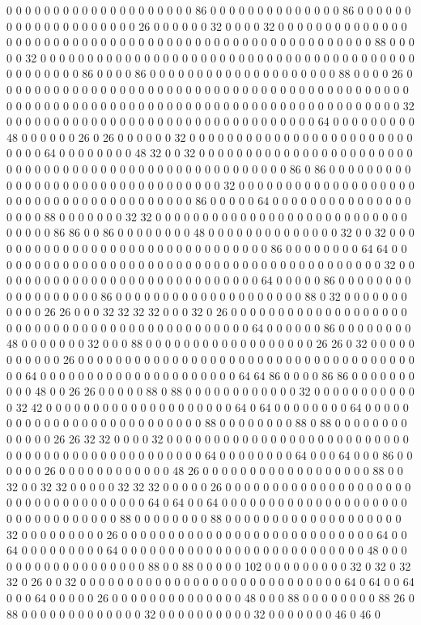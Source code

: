 0 0 0 0 0 0 0 0 0 0 0 0 0 0 0 0 0 0 0 0 86 0 0 0 0 0 0 0 0 0 0 0 0 0 0 86 0 0 0 0 0 0 0 0 0 0 0 0 0 0 0 0 0 0 0 0 26 0 0 0 0 0 0 32 0 0 0 0 32 0 0 0 0 0 0 0 0 0 0 0 0 0 0 0 0 0 0 0 0 0 0 0 0 0 0 0 0 0 0 0 0 0 0 0 0 0 0 0 0 0 0 0 0 0 0 0 0 0 0 0 0 0 88 0 0 0 0 0 32 0 0 0 0 0 0 0 0 0 0 0 0 0 0 0 0 0 0 0 0 0 0 0 0 0 0 0 0 0 0 0 0 0 0 0 0 0 0 0 0 0 0 0 0 0 0 0 0 86 0 0 0 0 86 0 0 0 0 0 0 0 0 0 0 0 0 0 0 0 0 0 0 0 0 88 0 0 0 0 26 0 0 0 0 0 0 0 0 0 0 0 0 0 0 0 0 0 0 0 0 0 0 0 0 0 0 0 0 0 0 0 0 0 0 0 0 0 0 0 0 0 0 0 0 0 0 0 0 0 0 0 0 0 0 0 0 0 0 0 0 0 0 0 0 0 0 0 0 0 0 0 0 0 0 0 0 0 0 0 0 0 0 0 0 0 0 32 0 0 0 0 0 0 0 0 0 0 0 0 0 0 0 0 0 0 0 0 0 0 0 0 0 0 0 0 0 0 0 0 0 64 0 0 0 0 0 0 0 0 0 48 0 0 0 0 0 0 26 0 26 0 0 0 0 0 0 32 0 0 0 0 0 0 0 0 0 0 0 0 0 0 0 0 0 0 0 0 0 0 0 0 0 0 0 0 64 0 0 0 0 0 0 0 0 48 32 0 0 32 0 0 0 0 0 0 0 0 0 0 0 0 0 0 0 0 0 0 0 0 0 0 0 0 0 0 0 0 0 0 0 0 0 0 0 0 0 0 0 0 0 0 0 0 0 0 0 0 0 0 0 0 0 86 0 86 0 0 0 0 0 0 0 0 0 0 0 0 0 0 0 0 0 0 0 0 0 0 0 0 0 0 0 0 0 0 0 0 32 0 0 0 0 0 0 0 0 0 0 0 0 0 0 0 0 0 0 0 0 0 0 0 0 0 0 0 0 0 0 0 0 0 0 0 0 0 0 0 86 0 0 0 0 0 64 0 0 0 0 0 0 0 0 0 0 0 0 0 0 0 0 0 0 0 88 0 0 0 0 0 0 0 32 32 0 0 0 0 0 0 0 0 0 0 0 0 0 0 0 0 0 0 0 0 0 0 0 0 0 0 0 0 0 0 0 0 86 86 0 0 86 0 0 0 0 0 0 0 0 48 0 0 0 0 0 0 0 0 0 0 0 0 0 0 32 0 0 32 0 0 0 0 0 0 0 0 0 0 0 0 0 0 0 0 0 0 0 0 0 0 0 0 0 0 0 0 0 0 0 86 0 0 0 0 0 0 0 0 64 64 0 0 0 0 0 0 0 0 0 0 0 0 0 0 0 0 0 0 0 0 0 0 0 0 0 0 0 0 0 0 0 0 0 0 0 0 0 0 0 0 0 0 32 0 0 0 0 0 0 0 0 0 0 0 0 0 0 0 0 0 0 0 0 0 0 0 0 0 0 0 0 0 64 0 0 0 0 0 86 0 0 0 0 0 0 0 0 0 0 0 0 0 0 0 0 0 0 86 0 0 0 0 0 0 0 0 0 0 0 0 0 0 0 0 0 0 0 0 88 0 32 0 0 0 0 0 0 0 0 0 0 0 26 26 0 0 0 32 32 32 32 0 0 0 32 0 26 0 0 0 0 0 0 0 0 0 0 0 0 0 0 0 0 0 0 0 0 0 0 0 0 0 0 0 0 0 0 0 0 0 0 0 0 0 0 0 0 0 0 0 0 0 64 0 0 0 0 0 0 86 0 0 0 0 0 0 0 0 48 0 0 0 0 0 0 0 32 0 0 0 88 0 0 0 0 0 0 0 0 0 0 0 0 0 0 0 0 0 0 26 26 0 32 0 0 0 0 0 0 0 0 0 0 0 26 0 0 0 0 0 0 0 0 0 0 0 0 0 0 0 0 0 0 0 0 0 0 0 0 0 0 0 0 0 0 0 0 0 0 0 0 0 0 64 0 0 0 0 0 0 0 0 0 0 0 0 0 0 0 0 0 0 0 0 0 64 64 86 0 0 0 0 86 86 0 0 0 0 0 0 0 0 0 0 48 0 0 26 26 0 0 0 0 0 88 0 88 0 0 0 0 0 0 0 0 0 0 0 0 32 0 0 0 0 0 0 0 0 0 0 0 0 32 42 0 0 0 0 0 0 0 0 0 0 0 0 0 0 0 0 0 0 0 0 64 0 64 0 0 0 0 0 0 0 0 64 0 0 0 0 0 0 0 0 0 0 0 0 0 0 0 0 0 0 0 0 0 0 0 0 0 0 88 0 0 0 0 0 0 0 0 88 0 88 0 0 0 0 0 0 0 0 0 0 0 0 0 26 26 32 32 0 0 0 0 32 0 0 0 0 0 0 0 0 0 0 0 0 0 0 0 0 0 0 0 0 0 0 0 0 0 0 0 0 0 0 0 0 0 0 0 0 0 0 0 0 0 0 0 0 0 0 0 64 0 0 0 0 0 0 0 0 64 0 0 0 64 0 0 0 86 0 0 0 0 0 0 26 0 0 0 0 0 0 0 0 0 0 0 0 48 26 0 0 0 0 0 0 0 0 0 0 0 0 0 0 0 0 0 0 88 0 0 32 0 0 32 32 0 0 0 0 0 32 32 32 0 0 0 0 0 26 0 0 0 0 0 0 0 0 0 0 0 0 0 0 0 0 0 0 0 0 0 0 0 0 0 0 0 0 0 0 0 0 0 0 0 64 0 64 0 0 64 0 0 0 0 0 0 0 0 0 0 0 0 0 0 0 0 0 0 0 0 0 0 0 0 0 0 0 0 0 0 0 0 88 0 0 0 0 0 0 0 0 88 0 0 0 0 0 0 0 0 0 0 0 0 0 0 0 0 0 0 0 32 0 0 0 0 0 0 0 0 0 26 0 0 0 0 0 0 0 0 0 0 0 0 0 0 0 0 0 0 0 0 0 0 0 0 0 0 0 64 0 0 64 0 0 0 0 0 0 0 0 0 64 0 0 0 0 0 0 0 0 0 0 0 0 0 0 0 0 0 0 0 0 0 0 0 0 0 0 48 0 0 0 0 0 0 0 0 0 0 0 0 0 0 0 0 0 0 88 0 0 88 0 0 0 0 0 102 0 0 0 0 0 0 0 0 0 32 0 32 0 32 32 0 26 0 0 32 0 0 0 0 0 0 0 0 0 0 0 0 0 0 0 0 0 0 0 0 0 0 0 0 0 0 0 0 64 0 64 0 0 64 0 0 0 64 0 0 0 0 0 26 0 0 0 0 0 0 0 0 0 0 0 0 0 0 48 0 0 0 88 0 0 0 0 0 0 0 0 88 26 0 88 0 0 0 0 0 0 0 0 0 0 0 0 0 32 0 0 0 0 0 0 0 0 0 0 32 0 0 0 0 0 0 0 46 0 46 0 